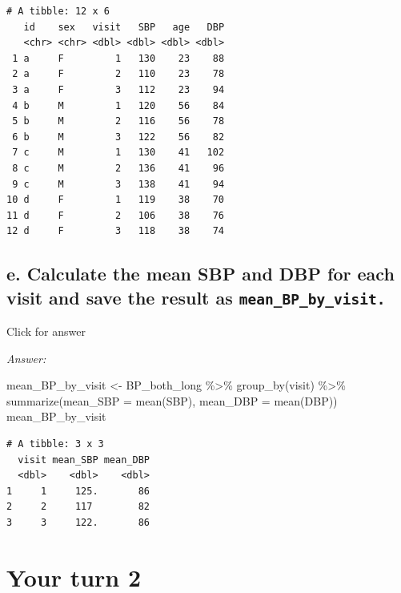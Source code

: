\documentclass[
]{book}
\newenvironment{Shaded}{\begin{snugshade}}{\end{snugshade}}
\newcommand{\AttributeTok}[1]{\textcolor[rgb]{0.77,0.63,0.00}{#1}}
\newcommand{\FunctionTok}[1]{\textcolor[rgb]{0.00,0.00,0.00}{#1}}
\newcommand{\NormalTok}[1]{#1}
\newcommand{\OtherTok}[1]{\textcolor[rgb]{0.56,0.35,0.01}{#1}}
\newcommand{\SpecialCharTok}[1]{\textcolor[rgb]{0.00,0.00,0.00}{#1}}
\begin{document}
\begin{verbatim}
# A tibble: 12 x 6
   id    sex   visit   SBP   age   DBP
   <chr> <chr> <dbl> <dbl> <dbl> <dbl>
 1 a     F         1   130    23    88
 2 a     F         2   110    23    78
 3 a     F         3   112    23    94
 4 b     M         1   120    56    84
 5 b     M         2   116    56    78
 6 b     M         3   122    56    82
 7 c     M         1   130    41   102
 8 c     M         2   136    41    96
 9 c     M         3   138    41    94
10 d     F         1   119    38    70
11 d     F         2   106    38    76
12 d     F         3   118    38    74
\end{verbatim}

\hypertarget{e.-calculate-the-mean-sbp-and-dbp-for-each-visit-and-save-the-result-as-mean_bp_by_visit.}{%
\subsection{\texorpdfstring{e. Calculate the mean SBP and DBP for each visit and save the result as \texttt{mean\_BP\_by\_visit.}}{e. Calculate the mean SBP and DBP for each visit and save the result as mean\_BP\_by\_visit.}}\label{e.-calculate-the-mean-sbp-and-dbp-for-each-visit-and-save-the-result-as-mean_bp_by_visit.}}

Click for answer

\emph{Answer:}

\begin{Shaded}
\begin{Highlighting}[]
\NormalTok{mean\_BP\_by\_visit }\OtherTok{\textless{}{-}}\NormalTok{ BP\_both\_long }\SpecialCharTok{\%\textgreater{}\%}
  \FunctionTok{group\_by}\NormalTok{(visit) }\SpecialCharTok{\%\textgreater{}\%}
  \FunctionTok{summarize}\NormalTok{(}\AttributeTok{mean\_SBP =} \FunctionTok{mean}\NormalTok{(SBP),}
            \AttributeTok{mean\_DBP =} \FunctionTok{mean}\NormalTok{(DBP))}
\NormalTok{mean\_BP\_by\_visit}
\end{Highlighting}
\end{Shaded}

\begin{verbatim}
# A tibble: 3 x 3
  visit mean_SBP mean_DBP
  <dbl>    <dbl>    <dbl>
1     1     125.       86
2     2     117        82
3     3     122.       86
\end{verbatim}

\hypertarget{your-turn-2}{%
\section{Your turn 2}\label{your-turn-2}}
\end{document}
